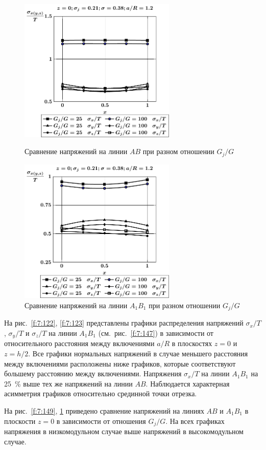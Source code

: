 \begin{figure}[h!]
\centering\footnotesize
\parbox[b]{7.5cm}{\centering\includegraphics[width=7.5cm]{inc31-g-a12-h10-r10-z0.pdf}
\caption{Сравнение напряжений на линии $AB$ при разном отношении $G_j/G$
\label{f:7:149}}}\hfil\hfil
\parbox[b]{7.5cm}{\centering\includegraphics[width=7.5cm]{inc31-g-a12-h10-r10-z0-a1b1.pdf}
\caption{Сравнение напряжений на линии $A_1B_1$ при разном отношении $G_j/G$
\label{f:7:150}}}
\end{figure}

На рис.~\ref{f:7:122}, \ref{f:7:123} представлены графики распределения напряжений $\sigma_x/T$, $\sigma_y/T$ и $\sigma_z/T$ на линии $A_1B_1$ (см.~рис.~\ref{f:7:147}) в зависимости от относительного расстояния между включениями $a/R$ в плоскостях $z=0$ и $z=h/2$. Все графики нормальных напряжений в случае меньшего расстояния между включениями расположены ниже графиков, которые соответствуют большему расстоянию между включениями. Напряжения $\sigma_x/T$ на линии $A_1B_1$ на 25~\% выше тех же напряжений на линии $AB$. Наблюдается характерная асимметрия графиков относительно срединной точки отрезка.

На рис.~\ref{f:7:149}, \ref{f:7:150} приведено сравнение напряжений на линиях $AB$ и $A_1B_1$ в плоскости $z=0$ в зависимости от отношения $G_j/G$. На всех графиках напряжения в низкомодульном случае выше напряжений в высокомодульном случае.

